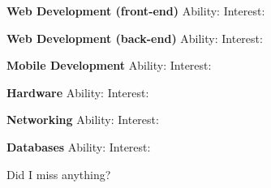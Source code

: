 \documentclass{article}
\begin{document}
\textbf{Web Development (front-end)} \qquad Ability: \qquad Interest: 
\vspace{5mm}

\textbf{Web Development (back-end)} \qquad Ability: \qquad Interest:
\vspace{5mm}

\textbf{Mobile Development} \qquad Ability: \qquad Interest:
\vspace{5mm}

\textbf{Hardware} \qquad Ability: \qquad Interest:
\vspace{5mm}

\textbf{Networking} \qquad Ability: \qquad Interest:
\vspace{5mm}

\textbf{Databases} \qquad Ability: \qquad Interest:
\vspace{5mm}

Did I miss anything?
\end{document}
